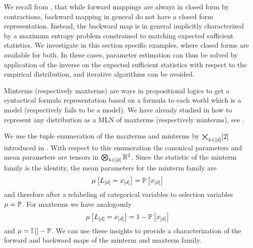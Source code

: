 
We recall from , that while forward mappings are always in closed form by contractions, backward mapping in general do not have a closed form representation.
Instead, the backward map is in general implicitly characterized by a maximum entropy problem constrained to matching expected sufficient statistics.
We investigate in this section specific examples, where closed forms are available for both.
In these cases, parameter estimation can thus be solved by application of the inverse on the expected sufficient statistics with respect to the empirical distribution, and iterative algorithms can be avoided.



Minterms (respectively maxterms) are ways in propositional logics to get a syntactical formula representation based on a formula to each world which is a model (respectively fails to be a model).
We have already studied in  how to represent any distribution as a MLN of maxterms (respectively minterms), see .

We use the tuple enumeration of the maxterms and minterms by $\bigtimes_{k\in[d]}[2]$ introduced in .
With respect to this enumeration the canonical parameters and mean parameters are tensors in $\bigotimes_{k\in[d]}\mathbb{R}^2$.
Since the statistic of the minterm family is the identity, the mean parameters for the minterm family are
\[ \mu\left[L_{[d]}=x_{[d]}\right]
= \mathbb{P}\left[x_{[d]}\right]
\]
and therefore after a relabeling of categorical variables to selection variables $\mu=\mathbb{P}$.
For maxterms we have analogously
\[ \mu\left[L_{[d]}=x_{[d]}\right]
= 1-\mathbb{P}\left[x_{[d]}\right]
\]
and $\mu = \mathbb{I}\left[\right]-\mathbb{P}$.
We can use these insights to provide a characterization of the forward and backward maps of the minterm and maxterm family.


